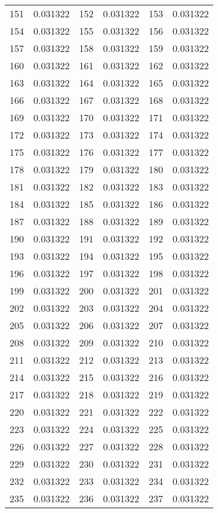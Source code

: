 \documentclass[12pt]{article}
\begin{document}
\begin{longtable}{@{}cc|cc|cc@{}}
151 & 0.031322 & 152 & 0.031322 & 153 & 0.031322 \\
154 & 0.031322 & 155 & 0.031322 & 156 & 0.031322 \\
157 & 0.031322 & 158 & 0.031322 & 159 & 0.031322 \\
160 & 0.031322 & 161 & 0.031322 & 162 & 0.031322 \\
163 & 0.031322 & 164 & 0.031322 & 165 & 0.031322 \\
166 & 0.031322 & 167 & 0.031322 & 168 & 0.031322 \\
169 & 0.031322 & 170 & 0.031322 & 171 & 0.031322 \\
172 & 0.031322 & 173 & 0.031322 & 174 & 0.031322 \\
175 & 0.031322 & 176 & 0.031322 & 177 & 0.031322 \\
178 & 0.031322 & 179 & 0.031322 & 180 & 0.031322 \\
181 & 0.031322 & 182 & 0.031322 & 183 & 0.031322 \\
184 & 0.031322 & 185 & 0.031322 & 186 & 0.031322 \\
187 & 0.031322 & 188 & 0.031322 & 189 & 0.031322 \\
190 & 0.031322 & 191 & 0.031322 & 192 & 0.031322 \\
193 & 0.031322 & 194 & 0.031322 & 195 & 0.031322 \\
196 & 0.031322 & 197 & 0.031322 & 198 & 0.031322 \\
199 & 0.031322 & 200 & 0.031322 & 201 & 0.031322 \\
202 & 0.031322 & 203 & 0.031322 & 204 & 0.031322 \\
205 & 0.031322 & 206 & 0.031322 & 207 & 0.031322 \\
208 & 0.031322 & 209 & 0.031322 & 210 & 0.031322 \\
211 & 0.031322 & 212 & 0.031322 & 213 & 0.031322 \\
214 & 0.031322 & 215 & 0.031322 & 216 & 0.031322 \\
217 & 0.031322 & 218 & 0.031322 & 219 & 0.031322 \\
220 & 0.031322 & 221 & 0.031322 & 222 & 0.031322 \\
223 & 0.031322 & 224 & 0.031322 & 225 & 0.031322 \\
226 & 0.031322 & 227 & 0.031322 & 228 & 0.031322 \\
229 & 0.031322 & 230 & 0.031322 & 231 & 0.031322 \\
232 & 0.031322 & 233 & 0.031322 & 234 & 0.031322 \\
235 & 0.031322 & 236 & 0.031322 & 237 & 0.031322 \\

\end{longtable}
\end{document}
